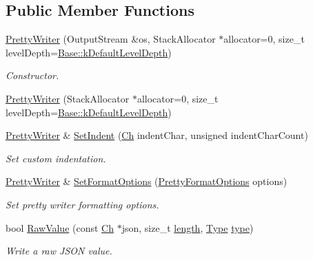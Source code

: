 \subsection*{Public Member Functions}
\begin{DoxyCompactItemize}
\item 
\hyperlink{classPrettyWriter_a928ac2a5235b8877048ebdd5f35a556f}{Pretty\+Writer} (Output\+Stream \&os, Stack\+Allocator $\ast$allocator=0, size\+\_\+t level\+Depth=\hyperlink{classWriter_a9cb4caeb9d8971f305edff1d70e67acb}{Base\+::k\+Default\+Level\+Depth})
\begin{DoxyCompactList}\small\item\em Constructor. \end{DoxyCompactList}\item 
\hyperlink{classPrettyWriter_a4a9077e0300c6b0e1c830a58c1e738d2}{Pretty\+Writer} (Stack\+Allocator $\ast$allocator=0, size\+\_\+t level\+Depth=\hyperlink{classWriter_a9cb4caeb9d8971f305edff1d70e67acb}{Base\+::k\+Default\+Level\+Depth})
\item 
\hyperlink{classPrettyWriter}{Pretty\+Writer} \& \hyperlink{classPrettyWriter_ad307b4c8d61af25042d0adcd0910c19a}{Set\+Indent} (\hyperlink{classPrettyWriter_ae35c89bda4c5d59d3ff6efcf2fea45a3}{Ch} indent\+Char, unsigned indent\+Char\+Count)
\begin{DoxyCompactList}\small\item\em Set custom indentation. \end{DoxyCompactList}\item 
\hyperlink{classPrettyWriter}{Pretty\+Writer} \& \hyperlink{classPrettyWriter_a1ff9dbeff9b9c724080cb65987a41b73}{Set\+Format\+Options} (\hyperlink{prettywriter_8h_a150fd6ef2dbf4025c33ece85451982d5}{Pretty\+Format\+Options} options)
\begin{DoxyCompactList}\small\item\em Set pretty writer formatting options. \end{DoxyCompactList}\item 
bool \hyperlink{classPrettyWriter_a440890a72408a150ef46edda6becdc94}{Raw\+Value} (const \hyperlink{classPrettyWriter_ae35c89bda4c5d59d3ff6efcf2fea45a3}{Ch} $\ast$json, size\+\_\+t \hyperlink{imgui__impl__opengl3__loader_8h_a011fc24f10426c01349e94a4edd4b0d5}{length}, \hyperlink{rapidjson_8h_a1d1cfd8ffb84e947f82999c682b666a7}{Type} \hyperlink{imgui__impl__opengl3__loader_8h_a63267399cd2a2ee217572c11d2e54f07}{type})
\begin{DoxyCompactList}\small\item\em Write a raw J\+S\+ON value. \end{DoxyCompactList}\end{DoxyCompactItemize}
